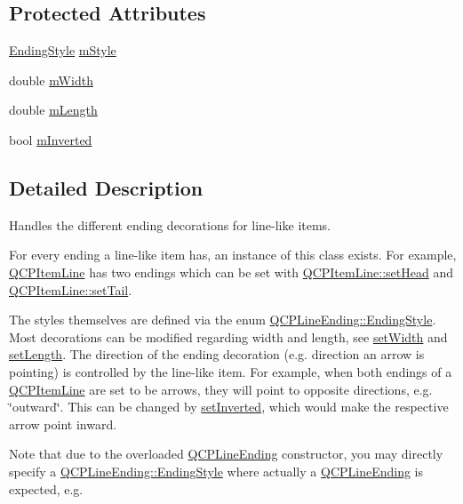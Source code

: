 \subsection*{Protected Attributes}
\begin{DoxyCompactItemize}
\item 
\hyperlink{classQCPLineEnding_a5ef16e6876b4b74959c7261d8d4c2cd5}{Ending\+Style} \hyperlink{classQCPLineEnding_a4696fc9117b60f1ca7690fcd2ba56611}{m\+Style}
\item 
double \hyperlink{classQCPLineEnding_aca89d21341133c20dc6825c33a5eac48}{m\+Width}
\item 
double \hyperlink{classQCPLineEnding_ae8e1e2566b96c05736cd92662dba8af8}{m\+Length}
\item 
bool \hyperlink{classQCPLineEnding_a91306fe771d54c955e0af21af14349d5}{m\+Inverted}
\end{DoxyCompactItemize}


\subsection{Detailed Description}
Handles the different ending decorations for line-\/like items. 

 For every ending a line-\/like item has, an instance of this class exists. For example, \hyperlink{classQCPItemLine}{Q\+C\+P\+Item\+Line} has two endings which can be set with \hyperlink{classQCPItemLine_aebf3d687114d584e0459db6759e2c3c3}{Q\+C\+P\+Item\+Line\+::set\+Head} and \hyperlink{classQCPItemLine_ac264222c3297a7efe33df9345c811a5f}{Q\+C\+P\+Item\+Line\+::set\+Tail}.

The styles themselves are defined via the enum \hyperlink{classQCPLineEnding_a5ef16e6876b4b74959c7261d8d4c2cd5}{Q\+C\+P\+Line\+Ending\+::\+Ending\+Style}. Most decorations can be modified regarding width and length, see \hyperlink{classQCPLineEnding_a26dc020ea985a72cc25881ce2115e34e}{set\+Width} and \hyperlink{classQCPLineEnding_ae36fa01763751cd64b7f56c3507e935a}{set\+Length}. The direction of the ending decoration (e.\+g. direction an arrow is pointing) is controlled by the line-\/like item. For example, when both endings of a \hyperlink{classQCPItemLine}{Q\+C\+P\+Item\+Line} are set to be arrows, they will point to opposite directions, e.\+g. \char`\"{}outward\char`\"{}. This can be changed by \hyperlink{classQCPLineEnding_a580e4e2360b35ebb8d68f3494aa2335d}{set\+Inverted}, which would make the respective arrow point inward.

Note that due to the overloaded \hyperlink{classQCPLineEnding}{Q\+C\+P\+Line\+Ending} constructor, you may directly specify a \hyperlink{classQCPLineEnding_a5ef16e6876b4b74959c7261d8d4c2cd5}{Q\+C\+P\+Line\+Ending\+::\+Ending\+Style} where actually a \hyperlink{classQCPLineEnding}{Q\+C\+P\+Line\+Ending} is expected, e.\+g. 
\begin{DoxyCodeInclude}
\end{DoxyCodeInclude}


